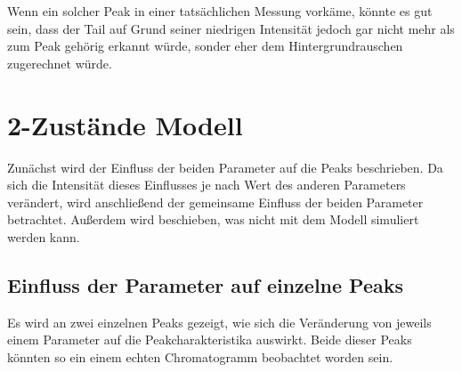 Wenn ein solcher Peak in einer tatsächlichen Messung vorkäme, könnte es gut sein, dass der Tail auf Grund seiner niedrigen Intensität jedoch gar nicht mehr als zum Peak gehörig erkannt würde, sonder eher dem Hintergrundrauschen zugerechnet würde.



\section{2-Zustände Modell} 
Zunächst wird der Einfluss der beiden Parameter auf die Peaks beschrieben. Da sich die Intensität dieses Einflusses je nach Wert des anderen Parameters verändert, wird anschließend der gemeinsame Einfluss der beiden Parameter betrachtet. Außerdem wird beschieben, was nicht mit dem Modell simuliert werden kann.

\subsection{Einfluss der Parameter auf einzelne Peaks}

Es wird an zwei einzelnen Peaks gezeigt, wie sich die Veränderung von jeweils einem Parameter auf die Peakcharakteristika auswirkt. Beide dieser Peaks könnten so ein einem echten Chromatogramm beobachtet worden sein.

